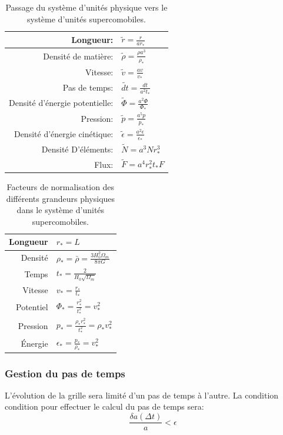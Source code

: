\begin{table}
\begin{center}
\begin{tabular}{r l} \hline 
Longueur: & $\tilde{r}=\frac{r}{ar_*}$ \\ \hline 
Densité de matière: & $\tilde{\rho}=\frac{\rho a^3}{\rho_*}$ \\ \hline 
Vitesse: & $ \tilde{v}=\frac{av}{v_*}$ \\ \hline 
Pas de temps: & $\tilde{dt}=\frac{dt}{a^2t_*}$\\ \hline 
Densité d’énergie potentielle: & $\tilde{\Phi}=\frac{a^2 \Phi}{\Phi_*}$\\ \hline 
Pression: & $\tilde{p}=\frac{a^5 p}{p_*}$\\ \hline 
Densité d’énergie cinétique: & $\tilde{\epsilon}=\frac{a^2 \epsilon}{\epsilon_*}$\\ \hline 
Densité D’éléments: & $\tilde{N}=a^3 N r_*^3$\\ \hline 
Flux: & $\tilde{F}=a^4 r_*^2 t_* F$\\ \hline 
\end{tabular} 
\end{center}
\caption[Système d'unité supercomobile]{Passage du système d'unités physique vers le système d'unités supercomobiles.
\label{tab:comobil}
} 
\end{table}

\begin{table}
\begin{center}
\begin{tabular}{r l} \hline 
Longueur  & $r_*=L$\\ \hline 
Densité & $\rho_* = \bar{\rho} = \frac{3H_0^2 \Omega_m}{8\pi G}$\\ \hline 
Temps & $t_* = \frac{2}{H_0 \sqrt{\Omega_m}}$\\ \hline 
Vitesse & $v_* = \frac{r_*}{t_*}$\\ \hline 
Potentiel & $\Phi_* = \frac{r_*^2}{t_*^2} = v_*^2$\\ \hline 
Pression & $p_* = \frac{\rho_* r_*^2}{t_*^2} = \rho_* v_*^2$\\ \hline 
Énergie & $\epsilon_* = \frac{p_*}{\rho_*} = v_*^2$\\ \hline 
\end{tabular} 
\end{center}
\caption[Facteurs de normalisation]{Facteurs de normalisation des différents grandeurs physiques dans le système d'unités supercomobiles.
\label{tab:comobilfact}}
\end{table}

\subsubsection{Gestion du pas de temps}
L'évolution de la grille sera limité d'un pas de temps à l'autre.
La condition condition pour effectuer le calcul du pas de temps sera:
\begin{equation}
\frac{\delta a (\Delta t) } {a} < \epsilon
\end{equation}

